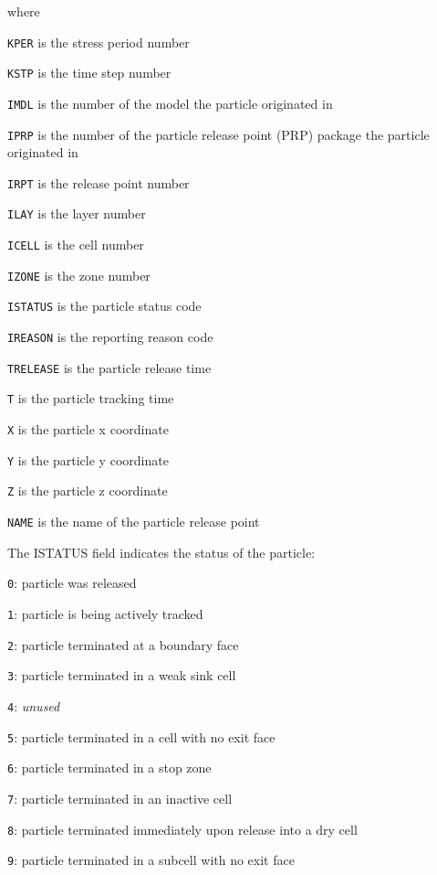 \vspace{2mm}
\noindent where

\begin{description} \itemsep0pt \parskip0pt 
\item \texttt{KPER} is the stress period number
\item \texttt{KSTP} is the time step number
\item \texttt{IMDL} is the number of the model the particle originated in
\item \texttt{IPRP} is the number of the particle release point (PRP) package the particle originated in
\item \texttt{IRPT} is the release point number
\item \texttt{ILAY} is the layer number
\item \texttt{ICELL} is the cell number
\item \texttt{IZONE} is the zone number
\item \texttt{ISTATUS} is the particle status code
\item \texttt{IREASON} is the reporting reason code
\item \texttt{TRELEASE} is the particle release time
\item \texttt{T} is the particle tracking time
\item \texttt{X} is the particle x coordinate
\item \texttt{Y} is the particle y coordinate
\item \texttt{Z} is the particle z coordinate
\item \texttt{NAME} is the name of the particle release point
\end{description}

The ISTATUS field indicates the status of the particle:

\begin{description} \itemsep0pt \parskip0pt 
\item \texttt{0}: particle was released
\item \texttt{1}: particle is being actively tracked
\item \texttt{2}: particle terminated at a boundary face
\item \texttt{3}: particle terminated in a weak sink cell
\item \texttt{4}: \textit{unused}
\item \texttt{5}: particle terminated in a cell with no exit face
\item \texttt{6}: particle terminated in a stop zone
\item \texttt{7}: particle terminated in an inactive cell
\item \texttt{8}: particle terminated immediately upon release into a dry cell
\item \texttt{9}: particle terminated in a subcell with no exit face
\end{description}

